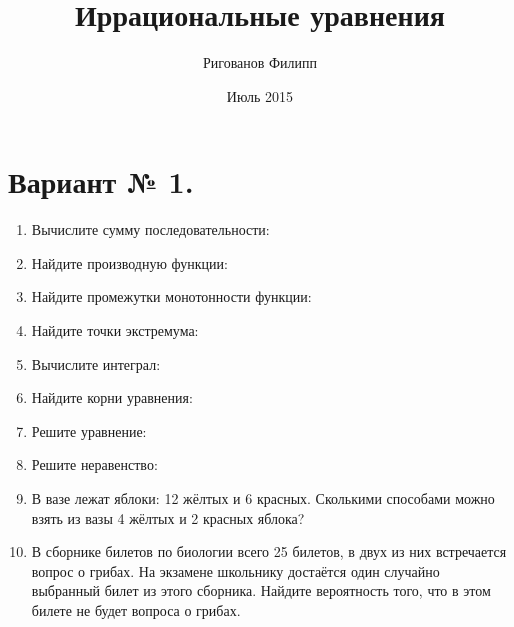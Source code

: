 \documentclass{article}
\title{Иррациональные уравнения}
\author{Ригованов Филипп}
\date{Июль 2015}
\begin{document}
\maketitle
\section*{Вариант № 1.}
\begin{enumerate}

\item %
Вычислите сумму последовательности:

\item %
Найдите производную функции:

\item %
Найдите промежутки монотонности функции:

\item %
Найдите точки экстремума:

\item %
Вычислите интеграл:

\item %
Найдите корни уравнения:

\item %
Решите уравнение:

\item %
Решите неравенство:

\item %
В вазе лежат яблоки: 12 жёлтых и 6 красных. Сколькими способами можно взять из вазы 4 жёлтых и 2 красных яблока?

\item %
В сборнике билетов по биологии всего 25 билетов, в двух из них встречается вопрос о грибах. На экзамене школьнику достаётся один случайно выбранный билет из этого сборника. Найдите вероятность того, что в этом билете не будет вопроса о грибах.

\end{enumerate}
\end{document}
